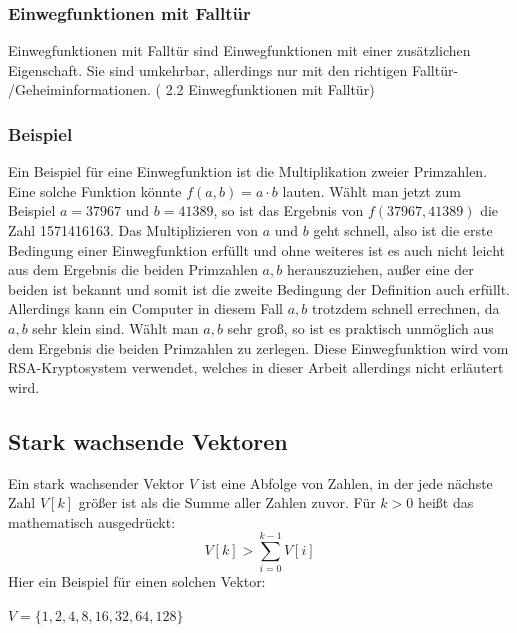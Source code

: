 \documentclass[a4paper,12pt,titlepage]{article}
\begin{document}
\subsubsection{Einwegfunktionen mit Falltür} \label{oneway_trapdoor}
Einwegfunktionen mit Falltür sind Einwegfunktionen mit einer zusätzlichen Eigenschaft. Sie sind umkehrbar, allerdings nur mit den richtigen Falltür- /Geheiminformationen. (\cite{oneway_lukas} 2.2 Einwegfunktionen mit Falltür)

\subsubsection{Beispiel}
Ein Beispiel für eine Einwegfunktion ist die Multiplikation zweier Primzahlen.
Eine solche Funktion könnte $f(a,b) = a \cdot b$ lauten. \newline Wählt man jetzt zum Beispiel $a = 37967$ und $b = 41389$, so ist das Ergebnis von $f(37967, 41389)$ die Zahl 1571416163. Das Multiplizieren von $a$ und $b$ geht schnell, also ist die erste Bedingung einer Einwegfunktion erfüllt und ohne weiteres ist es auch nicht leicht aus dem Ergebnis die beiden Primzahlen $a,b$ herauszuziehen, außer eine der beiden ist bekannt und somit ist die zweite Bedingung der Definition auch erfüllt. Allerdings kann ein Computer in diesem Fall $a,b$ trotzdem schnell errechnen, da $a,b$ sehr klein sind. Wählt man $a,b$ sehr groß, so ist es praktisch unmöglich aus dem Ergebnis die beiden Primzahlen zu zerlegen. Diese Einwegfunktion wird vom RSA-Kryptosystem verwendet, welches in dieser Arbeit allerdings nicht erläutert wird.

\subsection{Stark wachsende Vektoren}
Ein stark wachsender Vektor $V$ ist eine Abfolge von Zahlen, in der jede nächste Zahl $V[k]$ größer ist als die Summe aller Zahlen zuvor. Für $k > 0$ heißt das mathematisch ausgedrückt:
\begin{equation*}
V[k] > \sum_{i = 0}^{k - 1}V[i]
\end{equation*}
Hier ein Beispiel für einen solchen Vektor:
\begin{center}
$V = \{1, 2, 4, 8, 16, 32, 64, 128\}$
\end{center}

\newpage
\end{document}
